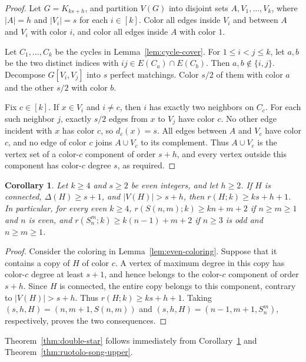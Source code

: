 \documentclass[11pt]{article}
\newtheorem{corollary}[theorem]{Corollary}
\theoremstyle{definition}
\theoremstyle{remark}
\begin{document}
\begin{proof}
Let \(G=K_{ks+h}\), and partition \(V(G)\) into disjoint sets
\(A,V_1,\ldots,V_k\), where \(|A|=h\) and \(|V_i|=s\) for each
\(i\in[k]\). Color all edges inside \(V_i\) and between \(A\)
and \(V_i\) with color \(i\), and color all edges inside \(A\)
with color \(1\).

Let \(C_1,\ldots,C_k\) be the cycles in Lemma~\ref{lem:cycle-cover}.
For \(1\le i<j\le k\), let \(a,b\) be the two distinct indices
with \(ij\in E(C_a)\cap E(C_b)\). Then \(a,b\notin\{i,j\}\).
Decompose \(G[V_i,V_j]\) into \(s\) perfect matchings. Color
\(s/2\) of them with color \(a\) and the other \(s/2\) with color
\(b\).

Fix \(c\in[k]\). If \(x\in V_i\) and \(i\ne c\), then \(i\)
has exactly two neighbors on \(C_c\). For each such neighbor \(j\),
exactly \(s/2\) edges from \(x\) to \(V_j\) have color \(c\).
No other edge incident with \(x\) has color \(c\), so
\(d_c(x)=s\). All edges between \(A\) and \(V_c\) have color
\(c\), and no edge of color \(c\) joins \(A\cup V_c\) to its
complement. Thus \(A\cup V_c\) is the vertex set of a
color-\(c\) component of order \(s+h\), and every vertex outside
this component has color-\(c\) degree \(s\), as required.
\end{proof}

\begin{corollary}\label{cor:component-isolation}
Let \(k\ge4\) and \(s\ge2\) be even integers, and let \(h\ge2\).
If \(H\) is connected, \(\Delta(H)\ge s+1\), and
\(|V(H)|>s+h\), then \(r(H;k)\ge ks+h+1\). In particular,
for every even \(k\ge4\), $r(S(n,m);k)\ge kn+m+2$ if \(n\ge m\ge1\) and \(n\) is even, and $r(S_n^m;k)\ge k(n-1)+m+2$ if \(n\ge3\) is odd and \(n\ge m\ge1\).
\end{corollary}

\begin{proof}
Consider the coloring in Lemma~\ref{lem:even-coloring}. Suppose
that it contains a copy of \(H\) of color \(c\). A vertex of
maximum degree in this copy has color-\(c\) degree at least
\(s+1\), and hence belongs to the color-\(c\) component of order
\(s+h\). Since \(H\) is connected, the entire copy belongs to this
component, contrary to \(|V(H)|>s+h\). Thus
\(r(H;k)\ge ks+h+1\). Taking \((s,h,H)=(n,m+1,S(n,m))\)
and \((s,h,H)=(n-1,m+1,S_n^m)\), respectively, proves the two
consequences.
\end{proof}

Theorem~\ref{thm:double-star} follows immediately from Corollary~\ref{cor:component-isolation} and Theorem~\ref{thm:ruotolo-song-upper}.
\medskip
\end{document}
